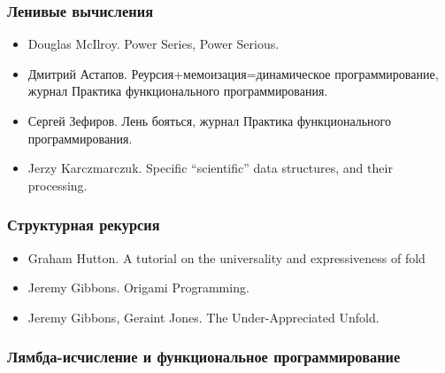 \subsubsection{Ленивые вычисления}

\begin{itemize}
\item
  Douglas McIlroy. Power Series, Power Serious.
\item
  Дмитрий Астапов. Реурсия+мемоизация=динамическое программирование,
  журнал Практика функционального программирования.
\item
  Сергей Зефиров. Лень бояться, журнал Практика функционального
  программирования.
\item
  Jerzy Karczmarczuk. Specific ``scientific'' data structures, and their
  processing.
\end{itemize}

\subsubsection{Структурная рекурсия}

\begin{itemize}
\item
  Graham Hutton. A tutorial on the universality and expressiveness of
  fold
\item
  Jeremy Gibbons. Origami Programming.
\item
  Jeremy Gibbons, Geraint Jones. The Under-Appreciated Unfold.
\end{itemize}

\subsubsection{Лямбда-исчисление и функциональное программирование}

